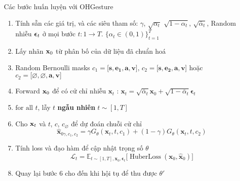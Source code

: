 \begin{frame}{Các bước huấn luyện với OHGesture}
	\begin{enumerate}
		\item Tính sẵn các giá trị, và các siêu tham số: $\gamma$, $\sqrt{\alpha_t}$ $\sqrt{1 - \alpha_t}$, $\sqrt{\bar{\alpha}_t}$, Random nhiễu ${\boldsymbol{\epsilon}}_t$ ở mọi bước $t: 1 \rightarrow T$.
		$\{\alpha_t \in (0, 1)\}_{t=1}^T$
		\item Lấy nhãn $\mathbf{x}_0$ từ phân bố của dữ liệu đã chuẩn hoá
		\item Random Bernoulli masks  $c_{1} = \big[ \mathbf{s} , \mathbf{e_1}, \mathbf{a}, \mathbf{v} \big]$, $c_{2} = \big[ \mathbf{s} , \mathbf{e_2}, \mathbf{a}, \mathbf{v}\big]$ hoặc $c_{2} = \big[ \varnothing , \varnothing, \mathbf{a},  \mathbf{v} \big]$
		\item Forward $\mathbf{x}_0$ để có cử chỉ nhiễu $\mathbf{x}_t$ :  $\mathbf{x}_t = \sqrt{\bar{\alpha}_t}\mathbf{x}_0 + \sqrt{1 - \bar{\alpha}_t}\boldsymbol{\epsilon}_t$
		\item $\text{for all}$ $t$, lẫy $t$ \textbf{ngẫu nhiên} $t \sim [1, T]$
		\item Cho $\mathbf{x}_t$ và $t$, $c$, $c_{\varnothing}$ để dự đoán chuỗi cử chỉ
		\begin{equation}
			\hat{\mathbf{x}}_{0 \gamma, c_{1}, c_{2}}=\gamma G_{\theta} \left(\mathbf{x}_{t}, t, c_{1}\right)+(1-\gamma) G_{\theta} \left(\mathbf{x}_{t}, t, c_{2}\right)
		\end{equation}
		\item Tính loss và đạo hàm để cập nhật trọng số $\theta$
		\begin{equation}
			\mathcal{L}_t = \mathbb{E}_{t \sim [1, T], \mathbf{x}_0, \boldsymbol{\epsilon}_t} \Big[ \operatorname{HuberLoss}(\mathbf{x}_0, \hat{\mathbf{x}}_0 ) \Big]
		\end{equation}
	
	
		\item Quay lại bước 6 cho đến khi hội tụ để thu được $\theta'$
	\end{enumerate}
\end{frame}


